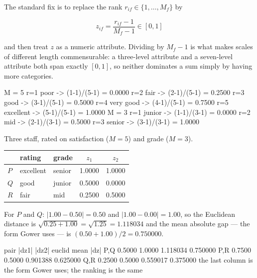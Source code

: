 \documentclass[11pt]{article}
\begin{document}
The standard fix is to replace the rank $r_{if} \in \{1,\dots,M_f\}$ by

\begin{equation}
  z_{if} = \frac{r_{if} - 1}{M_f - 1} \in [0,1]
  \label{eq:ordinal}
\end{equation}

and then treat $z$ as a numeric attribute. Dividing by $M_f - 1$ is what
makes scales of different length commensurable: a three-level attribute and a
seven-level attribute both span exactly $[0,1]$, so neither dominates a sum
simply by having more categories.

\begin{codeout}
M = 5
  r=1  poor       -> (1-1)/(5-1) = 0.0000
  r=2  fair       -> (2-1)/(5-1) = 0.2500
  r=3  good       -> (3-1)/(5-1) = 0.5000
  r=4  very good  -> (4-1)/(5-1) = 0.7500
  r=5  excellent  -> (5-1)/(5-1) = 1.0000
M = 3
  r=1  junior     -> (1-1)/(3-1) = 0.0000
  r=2  mid        -> (2-1)/(3-1) = 0.5000
  r=3  senior     -> (3-1)/(3-1) = 1.0000
\end{codeout}

\begin{worked}
Three staff, rated on satisfaction ($M=5$) and grade ($M=3$).
\begin{center}
\begin{tabular}{lllcc}
  \toprule
  & rating & grade & $z_1$ & $z_2$ \\ \midrule
  $P$ & excellent & senior & 1.0000 & 1.0000 \\
  $Q$ & good      & junior & 0.5000 & 0.0000 \\
  $R$ & fair      & mid    & 0.2500 & 0.5000 \\ \bottomrule
\end{tabular}
\end{center}
For $P$ and $Q$: $|1.00 - 0.50| = 0.50$ and $|1.00 - 0.00| = 1.00$, so the
Euclidean distance is $\sqrt{0.25 + 1.00} = \sqrt{1.25} = 1.118034$ and the
mean absolute gap --- the form Gower uses --- is
$(0.50 + 1.00)/2 = 0.750000$.
\end{worked}

\begin{codeout}
pair        |dz1|      |dz2|       euclid    mean |dz|
P,Q        0.5000     1.0000     1.118034     0.750000
P,R        0.7500     0.5000     0.901388     0.625000
Q,R        0.2500     0.5000     0.559017     0.375000
the last column is the form Gower uses; the ranking is the same
\end{codeout}
\end{document}

